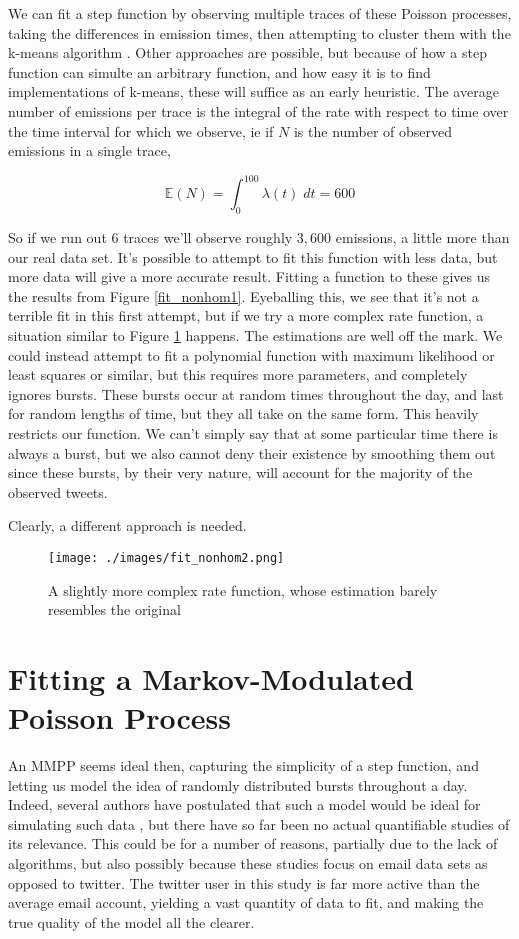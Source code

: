 We can fit a step function by observing multiple traces of these Poisson processes, taking the differences in emission times, then attempting to cluster them with the k-means algorithm \cite{kmeans}. Other approaches are possible, but because of how a step function can simulte an arbitrary function, and how easy it is to find implementations of k-means, these will suffice as an early heuristic. The average number of emissions per trace is the integral of the rate with respect to time over the time interval for which we observe, ie if $N$ is the number of observed emissions in a single trace,

$$
\mathbb{E}(N) = \int^{100}_0 \lambda(t) \; dt = 600
$$

So if we run out 6 traces we'll observe roughly $3,600$ emissions, a little more than our real data set. It's possible to attempt to fit this function with less data, but more data will give a more accurate result. Fitting a function to these gives us the results from Figure \ref{fit_nonhom1}. Eyeballing this, we see that it's not a terrible fit in this first attempt, but if we try a more complex rate function, a situation similar to Figure \ref{fit_nonhom2} happens. The estimations are well off the mark. We could instead attempt to fit a polynomial function with maximum likelihood or least squares or similar, but this requires more parameters, and completely ignores bursts. These bursts occur at random times throughout the day, and last for random lengths of time, but they all take on the same form. This heavily restricts our function. We can't simply say that at some particular time there is always a burst, but we also cannot deny their existence by smoothing them out since these bursts, by their very nature, will account for the majority of the observed tweets.

Clearly, a different approach is needed.

\begin{figure}[h]
\centering
\texttt{[image: ./images/fit\_nonhom2.png]}
\caption{A slightly more complex rate function, whose estimation barely resembles the original}
\label{fit_nonhom2}
\end{figure}

\clearpage

\section{Fitting a Markov-Modulated Poisson Process}

An MMPP seems ideal then, capturing the simplicity of a step function, and letting us model the idea of randomly distributed bursts throughout a day. Indeed, several authors have postulated that such a model would be ideal for simulating such data \cite{mmpp1}\cite{mmpp2}\cite{mmpp3}, but there have so far been no actual quantifiable studies of its relevance. This could be for a number of reasons, partially due to the lack of algorithms, but also possibly because these studies focus on email data sets as opposed to twitter. The twitter user in this study is far more active than the average email account, yielding a vast quantity of data to fit, and making the true quality of the model all the clearer.

